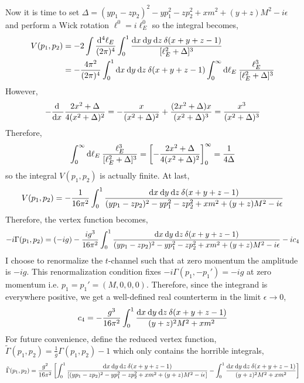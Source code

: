 \documentclass[12pt]{extarticle}
\begin{document}
Now it is time to set $\Delta = (y p_1 - z p_2)^2 - y p_1^2 - z p_2^2 + x m^2 + (y + z) M^2 - i \epsilon$ and perform a Wick rotation $\ell^0 = i \ell_E^0$ so the integral becomes,
\begin{align*}
V(p_1, p_2) & = -2 \int \frac{\mathrm{d}^4 \ell_E}{(2 \pi)^4} \int_0^1 \frac{\mathrm{d}x \: \mathrm{d}y \: \mathrm{d}z \: \delta(x + y + z - 1)}{[\ell_E^2 + \Delta]^3}
\\
& = - \frac{4 \pi^2}{(2 \pi)^4} \int_0^1 \mathrm{d}x \: \mathrm{d}y \: \mathrm{d}z \: \delta(x + y + z - 1) \int_{0}^\infty \mathrm{d}\ell_E \: \frac{\ell_E^3}{[\ell_E^2 + \Delta]^3}
\end{align*}
However, 
\[ - \frac{\mathrm{d} \:}{\mathrm{d}x \:} \frac{2 x^2 + \Delta}{4(x^2 + \Delta)^2} = -\frac{x}{(x^2 + \Delta)^2} + \frac{(2 x^2 + \Delta)x}{(x^2 + \Delta)^3} = \frac{x^3}{(x^2 + \Delta)^3}\]
Therefore, 
\[ \int_{0}^\infty \mathrm{d}\ell_E \: \frac{\ell_E^3}{[\ell_E^2 + \Delta]^3} = \left[ -\frac{2 x^2 + \Delta}{4(x^2 + \Delta)^2} \right]_{0}^\infty = \frac{1}{4 \Delta} \]
so the integral $V(p_1, p_2)$ is actually finite. At last,
\[ V(p_1, p_2) = -\frac{1}{16 \pi^2} \int_0^1 \frac{\mathrm{d}x \: \mathrm{d}y \: \mathrm{d}z \: \delta(x + y + z - 1) }{(y p_1 - z p_2)^2 - y p_1^2 - z p_2^2 + x m^2 + (y + z) M^2 - i \epsilon} \]
Therefore, the vertex function becomes,
\[ - i \Gamma(p_1, p_2) = (-ig) - \frac{ig^3}{16 \pi^2} \int_0^1 \frac{\mathrm{d}x \: \mathrm{d}y \: \mathrm{d}z \: \delta(x + y + z - 1) }{(y p_1 - z p_2)^2 - y p_1^2 - z p_2^2 + x m^2 + (y + z) M^2 - i \epsilon} - i c_4\]
I choose to renormalize the $t$-channel such that at zero momentum the amplitude is $-ig$. This renormalization condition fixes $-i \Gamma(p_1, -p_1') = - i g$ at zero momentum i.e. $p_1 = p_1' = (M, 0, 0, 0)$. 
Therefore, since the integrand is everywhere positive, we get a well-defined real counterterm in the limit $\epsilon \to 0$,
\[ c_4 = - \frac{g^3}{16 \pi^2} \int_0^1 \frac{\mathrm{d}x \: \mathrm{d}y \: \mathrm{d}z \: \delta(x + y + z - 1) }{(y + z)^2 M^2  + x m^2} \]
For future convenience, define the reduced vertex function, $\tilde{\Gamma}(p_1, p_2) = \frac{1}{g}\Gamma(p_1, p_2) - 1$ which only contains the horrible integrals,
\[ \tilde{\Gamma}(p_1, p_2) =  \frac{ g^2}{16 \pi^2} \left[ \int_0^1 \frac{\mathrm{d}x \: \mathrm{d}y \: \mathrm{d}z \: \delta(x + y + z - 1)}{[(y p_1 - z p_2)^2 - y p_1^2 - z p_2^2 + x m^2 + (y + z) M^2 - i \epsilon]} - \int_0^1 \frac{\mathrm{d}x \: \mathrm{d}y \: \mathrm{d}z \: \delta(x + y + z - 1) }{(y + z)^2 M^2  + x m^2} \right]\]
\end{document}
